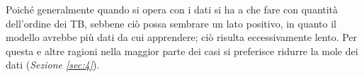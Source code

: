 \documentclass{subfiles}
\begin{document}
Poiché generalmente quando si opera con i dati si ha a che fare con quantità dell'ordine dei TB, sebbene ciò possa sembrare un lato positivo,
in quanto il modello avrebbe più dati da cui apprendere; ciò risulta eccessivamente lento.
Per questa e altre ragioni nella maggior parte dei casi si preferisce ridurre la mole dei dati (\emph{Sezione \eqref{sec:4}}).
\end{document}
